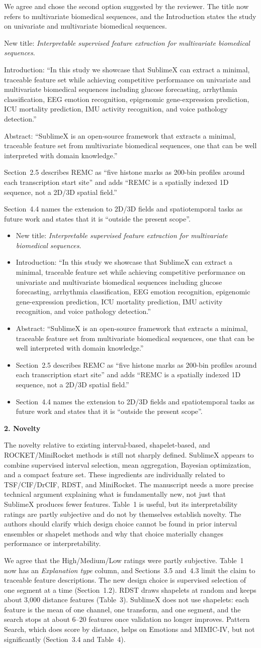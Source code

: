 \documentclass[11pt]{article}
\makeatletter
\newcommand{\rsp}{\par\vspace{0.9em}}
\newcommand{\rcitem}[2]{\begin{reviewerbox}\textbf{#1}\par\smallskip#2\end{reviewerbox}}
\newcommand{\response}[2]{%
  \begin{responsebox}#1%
  \def\@responseitems{#2}%
  \ifx\@responseitems\empty\else\begin{itemize}[nosep,leftmargin=1.2em]#2\end{itemize}\fi
  \end{responsebox}\rsp}
\makeatother
\begin{document}
\response{We agree and chose the second option suggested by the reviewer. The title now refers to
multivariate biomedical sequences, and the Introduction states the study on univariate and
multivariate biomedical sequences.}{
  \item New title: \emph{Interpretable supervised feature extraction for multivariate biomedical
    sequences}.
  \item Introduction: ``In this study we showcase that SublimeX can extract a minimal, traceable
    feature set while achieving competitive performance on univariate and multivariate biomedical
    sequences including glucose forecasting, arrhythmia classification, EEG emotion recognition,
    epigenomic gene-expression prediction, ICU mortality prediction, IMU activity recognition, and
    voice pathology detection.''
  \item Abstract: ``SublimeX is an open-source framework that extracts a minimal, traceable feature
    set from multivariate biomedical sequences, one that can be well interpreted with domain knowledge.''
  \item Section~2.5 describes REMC as ``five histone marks as 200-bin profiles around each
    transcription start site'' and adds ``REMC is a spatially indexed 1D sequence, not a 2D/3D
    spatial field.''
  \item Section~4.4 names the extension to 2D/3D fields and spatiotemporal tasks as future work and
    states that it is ``outside the present scope''.
}

\rcitem{2. Novelty}{The novelty relative to existing interval-based, shapelet-based, and
ROCKET/MiniRocket methods is still not sharply defined. SublimeX appears to combine supervised
interval selection, mean aggregation, Bayesian optimization, and a compact feature set. These
ingredients are individually related to TSF/CIF/DrCIF, RDST, and MiniRocket. The manuscript needs a
more precise technical argument explaining what is fundamentally new, not just that SublimeX produces
fewer features. Table~1 is useful, but its interpretability ratings are partly subjective and do not
by themselves establish novelty. The authors should clarify which design choice cannot be found in
prior interval ensembles or shapelet methods and why that choice materially changes performance or
interpretability.}

\response{We agree that the High/Medium/Low ratings were partly subjective. Table~1 now has an
\emph{Explanation type} column, and Sections~3.5 and~4.3 limit the claim to traceable feature
descriptions. The new design choice is supervised selection of one segment at a time (Section~1.2).
RDST draws shapelets at random and keeps about 3{,}000 distance features (Table~3).
SublimeX does not use shapelets: each feature is the mean of one channel, one transform, and one
segment, and the search stops at about 6--20 features once validation no longer improves.
Pattern Search, which does score by distance, helps on Emotions and MIMIC-IV, but not significantly
(Section~3.4 and Table~4).}{}
\end{document}
